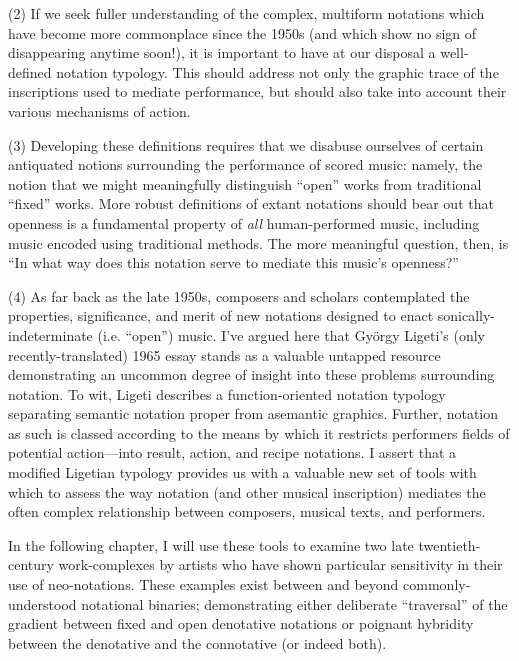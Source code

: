 (2) If we seek fuller understanding of the complex, multiform notations which have become more commonplace since the 1950s (and which show no sign of disappearing anytime soon!), it is important to have at our disposal a well-defined notation typology. This should address not only the graphic trace of the inscriptions used to mediate performance, but should also take into account their various mechanisms of action.

(3) Developing these definitions requires that we disabuse ourselves of certain antiquated notions surrounding the performance of scored music: namely, the notion that we might meaningfully distinguish ``open'' works from traditional ``fixed'' works. More robust definitions of extant notations should bear out that openness is a fundamental property of \textit{all} human-performed music, including music encoded using traditional methods. The more meaningful question, then, is ``In what way does this notation serve to mediate this music's openness?''

(4) As far back as the late 1950s, composers and scholars contemplated the properties, significance, and merit of new notations designed to enact sonically-indeterminate (i.e. ``open'') music. I've argued here that György Ligeti's (only recently-translated) 1965 essay stands as a valuable untapped resource demonstrating an uncommon degree of insight into these problems surrounding notation. To wit, Ligeti describes a function-oriented notation typology separating semantic notation proper from asemantic graphics. Further, notation as such is classed according to the means by which it restricts performers fields of potential action---into result, action, and recipe notations. I assert that a modified Ligetian typology provides us with a valuable new set of tools with which to assess the way notation (and other musical inscription) mediates the often complex relationship between composers, musical texts, and performers.

In the following chapter, I will use these tools to examine two late twentieth-century work-complexes by artists who have shown particular sensitivity in their use of neo-notations. These examples exist between and beyond commonly-understood notational binaries; demonstrating either deliberate ``traversal'' of the gradient between fixed and open denotative notations or poignant hybridity between the denotative and the connotative (or indeed both). 


